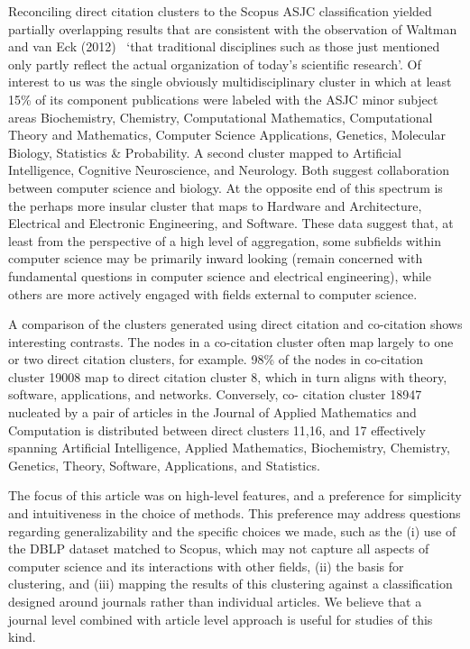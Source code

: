 Reconciling direct citation clusters to the Scopus ASJC classification yielded partially overlapping results that are consistent with the observation of Waltman and van Eck (2012)~\cite{waltman_new_2012} `that traditional disciplines such as those just mentioned only partly reflect the actual organization of today’s scientific research'. Of interest to us was the single obviously multidisciplinary cluster in which at least 15\% of its component publications were labeled with the ASJC minor subject areas Biochemistry, Chemistry, Computational Mathematics, Computational Theory and Mathematics, Computer Science Applications, Genetics, Molecular Biology, Statistics \& Probability. A second cluster mapped to Artificial Intelligence, Cognitive Neuroscience, and Neurology.  Both suggest collaboration between computer science and biology. At the opposite end of this spectrum is the perhaps more insular cluster that maps to Hardware and Architecture, Electrical and Electronic Engineering, and Software. These data suggest that, at least from the perspective of a high level of aggregation, some subfields within computer science may be primarily inward looking (remain concerned with fundamental questions in computer science and electrical engineering), while others are more actively engaged with fields external to computer science. 

A comparison of the clusters generated using direct citation and co-citation shows interesting contrasts. The nodes in a co-citation cluster often map largely to one or two direct citation clusters, for example. 98\% of the nodes in co-citation cluster 19008 map to direct citation cluster 8, which in turn aligns with theory, software, applications, and networks. Conversely, co- citation cluster 18947 nucleated by a pair of articles in the Journal of Applied Mathematics and Computation is distributed between direct clusters 11,16, and 17 effectively spanning Artificial Intelligence, Applied Mathematics, Biochemistry, Chemistry, Genetics, Theory, Software, Applications, and Statistics. 

The focus of this article was on high-level features, and a preference for simplicity and intuitiveness in the choice of methods. This preference may address questions  regarding generalizability and the specific choices we made, such as the (i) use of the DBLP dataset matched to Scopus, which may not capture all aspects of computer science and its interactions with other fields, (ii) the basis for clustering, and (iii) mapping the results of this clustering against a classification designed around journals rather than individual articles. We believe that a journal level combined with article level approach is useful for studies of this kind.  


